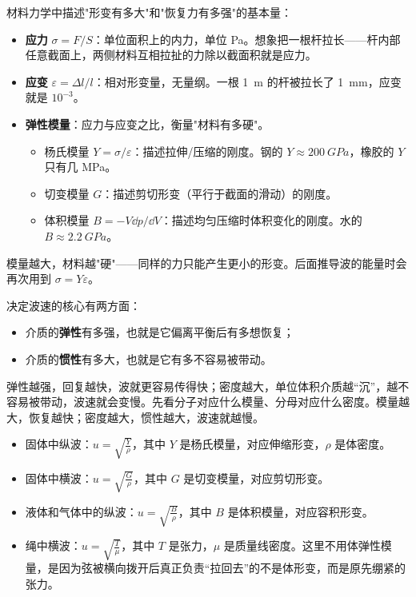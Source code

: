 \documentclass[lang=cn,11pt]{elegantbook}
\begin{document}
\begin{definition}[应力、应变与弹性模量]\label{def:elastic-modulus}
材料力学中描述"形变有多大"和"恢复力有多强"的基本量：
\begin{itemize}
 \item \textbf{应力} \(\sigma=F/S\)：单位面积上的内力，单位 \unit{Pa}。想象把一根杆拉长——杆内部任意截面上，两侧材料互相拉扯的力除以截面积就是应力。
 \item \textbf{应变} \(\varepsilon=\Delta l/l\)：相对形变量，无量纲。一根 \SI{1}{m} 的杆被拉长了 \SI{1}{mm}，应变就是 \(10^{-3}\)。
 \item \textbf{弹性模量}：应力与应变之比，衡量"材料有多硬"。
 \begin{itemize}
 \item 杨氏模量 \(Y=\sigma/\varepsilon\)：描述拉伸/压缩的刚度。钢的 \(Y\approx\SI{200}{GPa}\)，橡胶的 \(Y\) 只有几 MPa。
 \item 切变模量 \(G\)：描述剪切形变（平行于截面的滑动）的刚度。
 \item 体积模量 \(B=-V\dd p/\dd V\)：描述均匀压缩时体积变化的刚度。水的 \(B\approx\SI{2.2}{GPa}\)。
 \end{itemize}
\end{itemize}
模量越大，材料越"硬"——同样的力只能产生更小的形变。后面推导波的能量时会再次用到 \(\sigma=Y\varepsilon\)。
\end{definition}
决定波速的核心有两方面：
\begin{itemize}
 \item 介质的\textbf{弹性}有多强，也就是它偏离平衡后有多想恢复；
 \item 介质的\textbf{惯性}有多大，也就是它有多不容易被带动。
\end{itemize}
弹性越强，回复越快，波就更容易传得快；密度越大，单位体积介质越“沉”，越不容易被带动，波速就会变慢。先看分子对应什么模量、分母对应什么密度。模量越大，恢复越快；密度越大，惯性越大，波速就越慢。
\begin{itemize}
 \item 固体中纵波：\(u=\sqrt{\frac{Y}{\rho}}\)，其中 \(Y\) 是杨氏模量，对应伸缩形变，\(\rho\) 是体密度。
 \item 固体中横波：\(u=\sqrt{\frac{G}{\rho}}\)，其中 \(G\) 是切变模量，对应剪切形变。
 \item 液体和气体中的纵波：\(u=\sqrt{\frac{B}{\rho}}\)，其中 \(B\) 是体积模量，对应容积形变。
 \item 绳中横波：\(u=\sqrt{\frac{T}{\mu}}\)，其中 \(T\) 是张力，\(\mu\) 是质量线密度。这里不用体弹性模量，是因为弦被横向拨开后真正负责“拉回去”的不是体形变，而是原先绷紧的张力。
\end{itemize}
\end{document}
